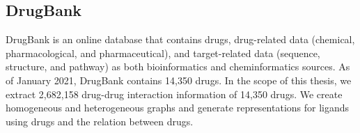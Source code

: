 \subsection{DrugBank}
DrugBank \cite{wishart2006drugbank, wishart2008drugbank, wishart2018drugbank} is an online database that contains drugs, drug-related data (chemical, pharmacological, and pharmaceutical), and target-related data (sequence, structure, and pathway) as both bioinformatics and cheminformatics sources. As of January 2021, DrugBank contains 14,350 drugs. In the scope of this thesis, we extract 2,682,158 drug-drug interaction information of 14,350 drugs. We create homogeneous and heterogeneous graphs and generate representations for ligands using drugs and the relation between drugs.

% 
